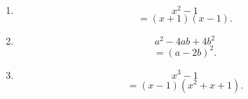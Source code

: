 \begin{enumerate}
\item
\[
x^2 - 1 
\]
\[
= (x+1)(x-1).
\]
\item
\[
a^2-4ab+4b^2
\]
\[
= (a-2b)^2.
\]
\item
\[
x^3 - 1 
\]
\[
= (x-1)(x^2+x + 1).
\]
\end{enumerate}
